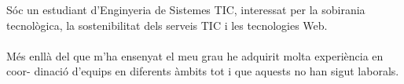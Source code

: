 \documentclass[9pt]{developercv} %
\begin{document}
\vspace{0.5cm}



\begin{minipage}[t]{0.4\textwidth} %
	\vspace{-\baselineskip} %
    Sóc un estudiant d’Enginyeria de Sistemes
    TIC, interessat per la sobirania tecnològica, la
    sostenibilitat dels serveis TIC i les tecnologies
    Web.
    \\
    \\
    Més enllà del que m’ha ensenyat el meu
    grau he adquirit molta experiència en coor-
    dinació d’equips en diferents àmbits tot i que
    aquests no han sigut laborals.
\end{minipage}
\hfill %
\begin{minipage}[t]{0.5\textwidth} %
	\vspace{-\baselineskip} %
	\begin{barchart}{5.5}
	\end{barchart}
\end{minipage}


\end{document}

